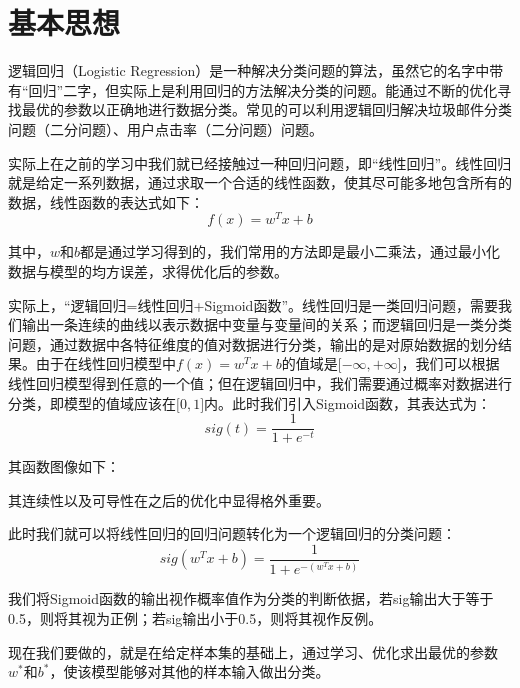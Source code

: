 \documentclass[12pt]{article}
\begin{document}
\section{基本思想}
逻辑回归（Logistic Regression）是一种解决分类问题的算法，虽然它的名字中带有“回归”二字，但实际上是利用回归的方法解决分类的问题。能通过不断的优化寻找最优的参数以正确地进行数据分类。常见的可以利用逻辑回归解决垃圾邮件分类问题（二分问题）、用户点击率（二分问题）问题。\par
实际上在之前的学习中我们就已经接触过一种回归问题，即“线性回归”。线性回归就是给定一系列数据，通过求取一个合适的线性函数，使其尽可能多地包含所有的数据，线性函数的表达式如下：
\[f(x)=w^Tx+b\]\par
其中，$w$和$b$都是通过学习得到的，我们常用的方法即是最小二乘法，通过最小化数据与模型的均方误差，求得优化后的参数。\par
实际上，“逻辑回归=线性回归+Sigmoid函数”。线性回归是一类回归问题，需要我们输出一条连续的曲线以表示数据中变量与变量间的关系；而逻辑回归是一类分类问题，通过数据中各特征维度的值对数据进行分类，输出的是对原始数据的划分结果。由于在线性回归模型中$f(x)=w^Tx+b$的值域是$\lbrack-\infty,+\infty\rbrack$，我们可以根据线性回归模型得到任意的一个值；但在逻辑回归中，我们需要通过概率对数据进行分类，即模型的值域应该在$\lbrack0,1\rbrack$内。此时我们引入Sigmoid函数，其表达式为：
\[sig(t)=\frac{1}{1+e^{-t}}\]\par
其函数图像如下：
\begin{figure}[H]
    \centering
\end{figure}
其连续性以及可导性在之后的优化中显得格外重要。\par
此时我们就可以将线性回归的回归问题转化为一个逻辑回归的分类问题：
\[sig(w^Tx+b)=\frac{1}{1+e^{-(w^Tx+b)}}\]\par
我们将Sigmoid函数的输出视作概率值作为分类的判断依据，若sig输出大于等于0.5，则将其视为正例；若sig输出小于0.5，则将其视作反例。\par
现在我们要做的，就是在给定样本集的基础上，通过学习、优化求出最优的参数$w^*$和$b^*$，使该模型能够对其他的样本输入做出分类。
\end{document}
